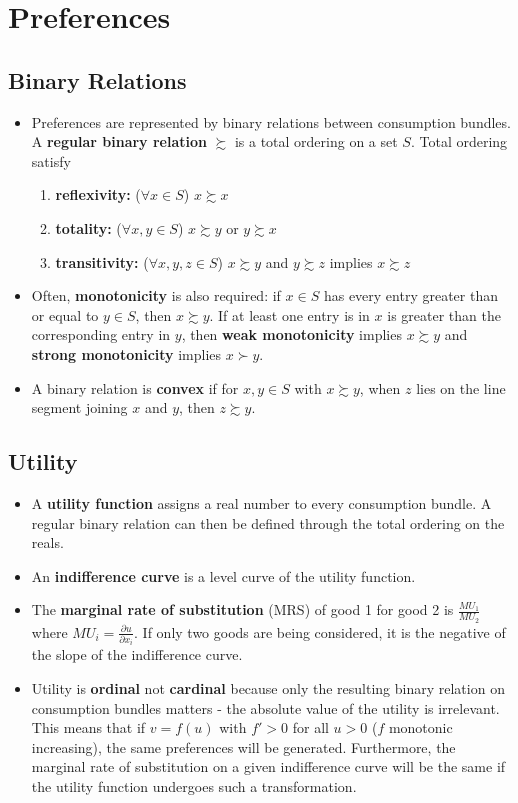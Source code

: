 \documentclass[a4paper]{article}
\begin{document}
\section{Preferences}
\subsection{Binary Relations}
\begin{itemize}
    \item Preferences are represented by binary relations between consumption bundles. A \textbf{regular binary relation} $\succsim$ is a total ordering on a set $S$. Total ordering satisfy
    \begin{enumerate}
        \item \textbf{reflexivity:} ($\forall x \in S$) $x \succsim x$
        \item \textbf{totality:} ($\forall x, y \in S$) $x \succsim y$ or $y \succsim x$
        \item \textbf{transitivity:} ($\forall x, y, z \in S$) $x \succsim y$ and $y \succsim z$ implies $x \succsim z$
    \end{enumerate}
    \item Often, \textbf{monotonicity} is also required: if $x \in S$ has every entry greater than or equal to $y \in S$, then $x \succsim y$. If at least one entry is in $x$ is greater than the corresponding entry in $y$, then \textbf{weak monotonicity} implies $x \succsim y$ and \textbf{strong monotonicity} implies $x \succ y$.
    \item A binary relation is \textbf{convex} if for $x, y \in S$ with $x \succsim y$, when $z$ lies on the line segment joining $x$ and $y$, then $z \succsim y$.
\end{itemize}

\subsection{Utility}
\begin{itemize}
    \item A \textbf{utility function} assigns a real number to every consumption bundle. A regular binary relation can then be defined through the total ordering on the reals.
    \item An \textbf{indifference curve} is a level curve of the utility function.
    \item The \textbf{marginal rate of substitution} (MRS) of good 1 for good 2 is $\frac{MU_1}{MU_2}$ where $MU_i = \frac{\partial u}{\partial x_i}$. If only two goods are being considered, it is the negative of the slope of the indifference curve.
    \item Utility is \textbf{ordinal} not \textbf{cardinal} because only the resulting binary relation on consumption bundles matters - the absolute value of the utility is irrelevant. This means that if $v = f(u)$ with $f' > 0$ for all $u > 0$ ($f$ monotonic increasing), the same preferences will be generated. Furthermore, the marginal rate of substitution on a given indifference curve will be the same if the utility function undergoes such a transformation. 
\end{itemize}
\end{document}
